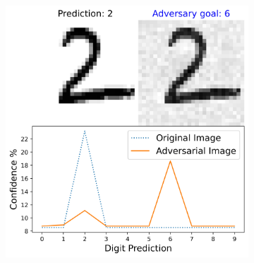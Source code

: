         \begin{figure}[H]
            \centering
            \begin{subfigure}{0.7\linewidth}
                \centering
                \includegraphics[width=\textwidth]{images/generated_adversarial_image_3.jpg}
                \caption{}
            \end{subfigure}
            \begin{subfigure}{0.7\linewidth}
                \centering

\end{subfigure}
\end{figure}
